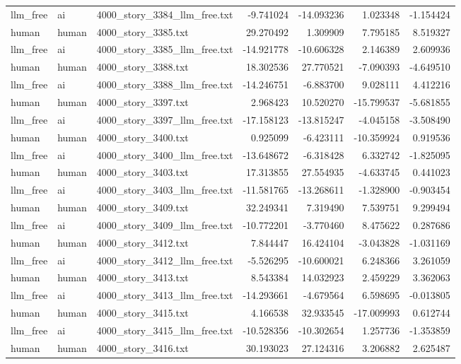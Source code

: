 \begin{longtable}{lllrrrr}
llm\_free & ai & 4000\_story\_3384\_llm\_free.txt & -9.741024 & -14.093236 & 1.023348 & -1.154424 \\
human & human & 4000\_story\_3385.txt & 29.270492 & 1.309909 & 7.795185 & 8.519327 \\
llm\_free & ai & 4000\_story\_3385\_llm\_free.txt & -14.921778 & -10.606328 & 2.146389 & 2.609936 \\
human & human & 4000\_story\_3388.txt & 18.302536 & 27.770521 & -7.090393 & -4.649510 \\
llm\_free & ai & 4000\_story\_3388\_llm\_free.txt & -14.246751 & -6.883700 & 9.028111 & 4.412216 \\
human & human & 4000\_story\_3397.txt & 2.968423 & 10.520270 & -15.799537 & -5.681855 \\
llm\_free & ai & 4000\_story\_3397\_llm\_free.txt & -17.158123 & -13.815247 & -4.045158 & -3.508490 \\
human & human & 4000\_story\_3400.txt & 0.925099 & -6.423111 & -10.359924 & 0.919536 \\
llm\_free & ai & 4000\_story\_3400\_llm\_free.txt & -13.648672 & -6.318428 & 6.332742 & -1.825095 \\
human & human & 4000\_story\_3403.txt & 17.313855 & 27.554935 & -4.633745 & 0.441023 \\
llm\_free & ai & 4000\_story\_3403\_llm\_free.txt & -11.581765 & -13.268611 & -1.328900 & -0.903454 \\
human & human & 4000\_story\_3409.txt & 32.249341 & 7.319490 & 7.539751 & 9.299494 \\
llm\_free & ai & 4000\_story\_3409\_llm\_free.txt & -10.772201 & -3.770460 & 8.475622 & 0.287686 \\
human & human & 4000\_story\_3412.txt & 7.844447 & 16.424104 & -3.043828 & -1.031169 \\
llm\_free & ai & 4000\_story\_3412\_llm\_free.txt & -5.526295 & -10.600021 & 6.248366 & 3.261059 \\
human & human & 4000\_story\_3413.txt & 8.543384 & 14.032923 & 2.459229 & 3.362063 \\
llm\_free & ai & 4000\_story\_3413\_llm\_free.txt & -14.293661 & -4.679564 & 6.598695 & -0.013805 \\
human & human & 4000\_story\_3415.txt & 4.166538 & 32.933545 & -17.009993 & 0.612744 \\
llm\_free & ai & 4000\_story\_3415\_llm\_free.txt & -10.528356 & -10.302654 & 1.257736 & -1.353859 \\
human & human & 4000\_story\_3416.txt & 30.193023 & 27.124316 & 3.206882 & 2.625487 \\

\end{longtable}
